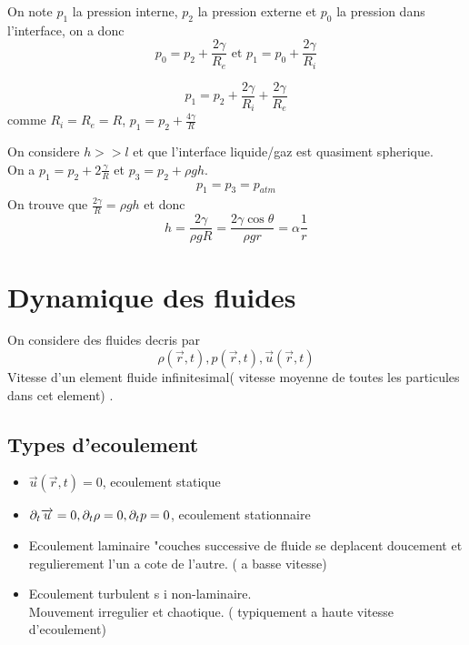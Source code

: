 \documentclass[../main.tex]{subfiles}
\begin{document}
\begin{exemple}
	On note $p_1$ la pression interne, $p_2$ la pression externe et $p_0$ la pression dans l'interface, on a donc
	\[ 
	p_0 = p_2 + \frac{2\gamma}{R_e} \text{ et } p_1 = p_0 + \frac{2\gamma}{R_i}
	\]
	
	\[ 
		p_1 = p_2 + \frac{2 \gamma}{ R_i } + \frac{2\gamma}{R_e}
	\]
	comme $R_i= R_e = R$, $p_1 = p_2 + \frac{4\gamma}{R}$


\end{exemple}
\begin{exemple}[Capilarite]
	On considere $h >> l$ et que l'interface liquide/gaz est quasiment spherique.\\
	On a $p_1 = p_2 + 2 \frac{\gamma}{R}$ et $p_3 = p_2 + \rho gh$.\\
	\begin{align*}
p_1 = p_3 = p_{atm} 	
	\end{align*}
	On trouve que $\frac{2\gamma}{R}= \rho gh$ et donc
	\[ 
	h= \frac{2\gamma}{\rho g R}= \frac{2\gamma\cos \theta}{\rho gr} = \alpha \frac{1}{r}
	\]
	

\end{exemple}
\section{Dynamique des fluides}
On considere des fluides decris par
\[ 
	\rho( \vec{r},t) , p( \vec{r},t) , \vec{u}( \vec{r},t) 
\]
Vitesse d'un element fluide infinitesimal( vitesse moyenne de toutes les particules dans cet element) .\\
\subsection{Types d'ecoulement}
\begin{itemize}
	\item $\vec{u}( \vec{r},t) =0$, ecoulement statique
	\item $ \partial_t \overrightarrow{u}= 0, \partial_t \rho=0, \partial_t p =0$, ecoulement stationnaire
	\item Ecoulement laminaire "couches successive de fluide se deplacent doucement et regulierement l'un a cote de l'autre. ( a basse vitesse) 
	\item Ecoulement turbulent s i non-laminaire.\\
		Mouvement irregulier et chaotique. ( typiquement a haute vitesse d'ecoulement) 
\end{itemize}
\end{document}
